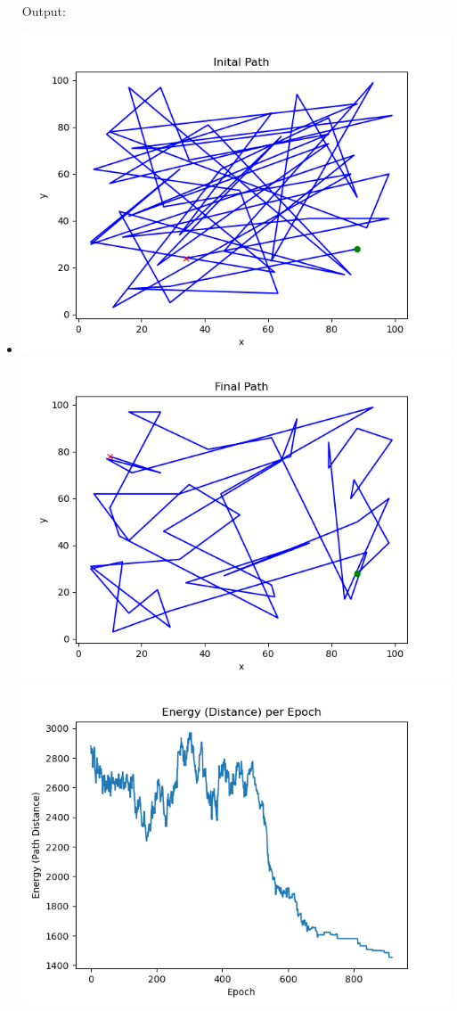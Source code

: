 \documentclass[a4paper,10pt]{article}
\begin{document}
\begin{itemize}
  Output:
\item \includegraphics[scale=0.5]{latexGraphs/3_inital_path.png}
\includegraphics[scale=0.5]{latexGraphs/3_final_path.png}
\includegraphics[scale=0.5]{latexGraphs/3_energy.png}

\end{itemize}
\end{document}
